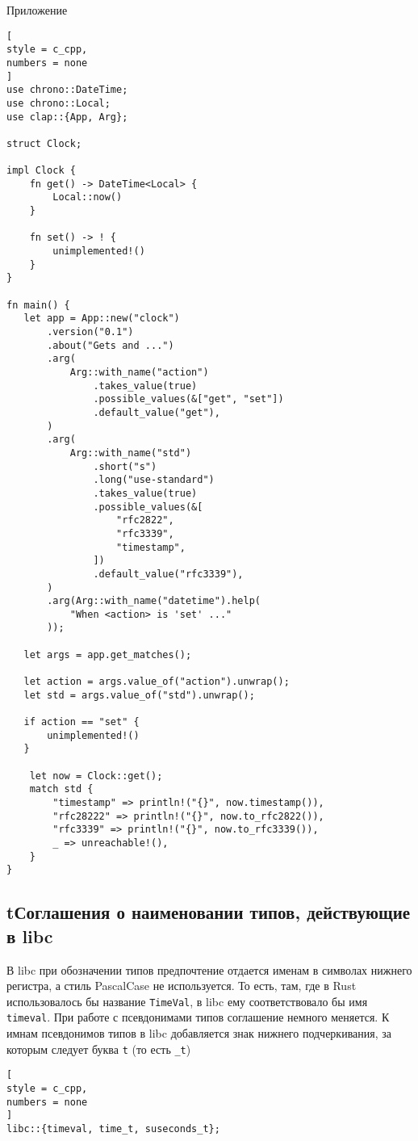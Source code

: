 \documentclass[%
	11pt,
	a4paper,
	utf8,
		]{article}
\begin{document}
Приложение
\begin{lstlisting}[
style = c_cpp,
numbers = none
]
use chrono::DateTime;
use chrono::Local;
use clap::{App, Arg};

struct Clock;

impl Clock {
    fn get() -> DateTime<Local> {
        Local::now()
    }

    fn set() -> ! {
        unimplemented!()
    }
}

fn main() {
   let app = App::new("clock")
       .version("0.1")
       .about("Gets and ...")
       .arg(
           Arg::with_name("action")
               .takes_value(true)
               .possible_values(&["get", "set"])
               .default_value("get"),
       )
       .arg(
           Arg::with_name("std")
               .short("s")
               .long("use-standard")
               .takes_value(true)
               .possible_values(&[
                   "rfc2822",
                   "rfc3339",
                   "timestamp",
               ])
               .default_value("rfc3339"),
       )
       .arg(Arg::with_name("datetime").help(
           "When <action> is 'set' ..."
       ));
       
   let args = app.get_matches();
   
   let action = args.value_of("action").unwrap();
   let std = args.value_of("std").unwrap();
   
   if action == "set" {
       unimplemented!()
   }

    let now = Clock::get();
    match std {
        "timestamp" => println!("{}", now.timestamp()),
        "rfc28222" => println!("{}", now.to_rfc2822()),
        "rfc3339" => println!("{}", now.to_rfc3339()),
        _ => unreachable!(),
    }
}
\end{lstlisting}

\subsection{tСоглашения о наименовании типов, действующие в libc}

В libc при обозначении типов предпочтение отдается именам в символах нижнего регистра, а стиль PascalCase не используется. То есть, там, где в Rust использовалось бы название \verb|TimeVal|, в libc ему соответствовало бы имя \verb|timeval|. При работе с псевдонимами типов соглашение немного меняется. К имнам псевдонимов типов в libc добавляется знак нижнего подчеркивания, за которым следует буква \verb|t| (то есть \verb|_t|)
\begin{lstlisting}[
style = c_cpp,
numbers = none
]
libc::{timeval, time_t, suseconds_t};
\end{lstlisting}
\end{document}
